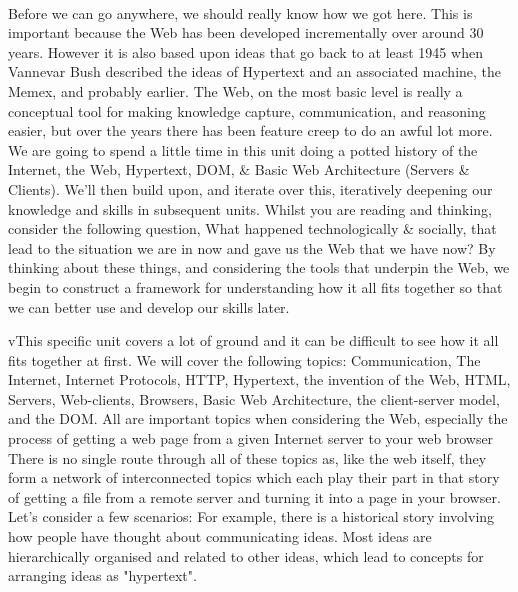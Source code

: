 \documentclass[12pt, a4paper, oneside]{book}
\begin{document}
\paragraph{} Before we can go anywhere, we should really know how we got here. This is important because the Web has been developed incrementally over around 30 years. However it is also based upon ideas that go back to at least 1945 when Vannevar Bush described the ideas of Hypertext and an associated machine, the Memex, and probably earlier. The Web, on the most basic level is really a conceptual tool for making knowledge capture, communication, and reasoning easier, but over the years there has been feature creep to do an awful lot more.
We are going to spend a little time in this unit doing a potted history of the Internet, the Web, Hypertext, DOM, \& Basic Web Architecture (Servers \& Clients). We'll then build upon, and iterate over this, iteratively deepening our knowledge and skills in subsequent units.
Whilst you are reading and thinking, consider the following question, What happened technologically \& socially, that lead to the situation we are in now and gave us the Web that we have now? 
By thinking about these things, and considering the tools that underpin the Web, we begin to construct a framework for understanding how it all fits together so that we can better use and develop our skills later.
 
vThis specific unit covers a lot of ground and it can be difficult to see how it all fits together at first. We will cover the following topics: Communication, The Internet, Internet Protocols, HTTP, Hypertext, the invention of the Web, HTML, Servers, Web-clients, Browsers, Basic Web Architecture, the client-server model, and the DOM. All are important topics when considering the Web, especially the process of getting a web page from a given Internet server to your web browser There is no single route through all of these topics as, like the web itself, they form a network of interconnected topics which each play their part in that story of getting a file from a remote server and turning it into a page in your browser. Let's consider a few scenarios:
For example, there is a historical story involving how people have thought about communicating ideas. Most ideas are hierarchically organised and related to other ideas, which lead to concepts for arranging ideas as "hypertext".
\end{document}
